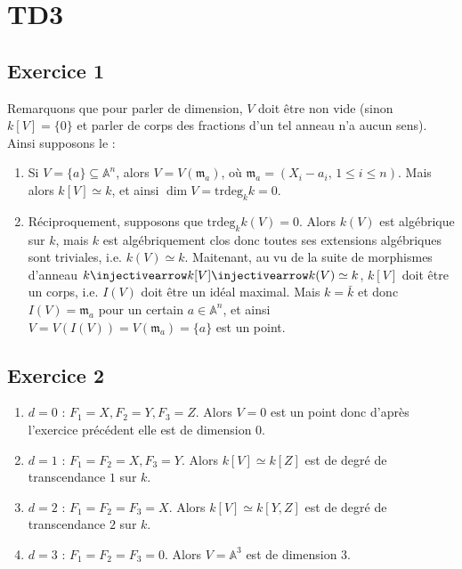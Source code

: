 \chapter{TD3}
    \section{Exercice 1}
        Remarquons que pour parler de dimension, $V$ doit être non vide (sinon $k[V] = \{0\}$ et parler de corps des fractions d'un tel anneau n'a aucun sens). Ainsi supposons le :
        \begin{enumerate}
            \item Si $V = \{a\} \subseteq \mathbb{A}^n$, alors $V = V(\mathfrak{m}_a)$, où $\mathfrak{m}_a = (X_i - a_i,\, 1 \leq i \leq n)$. Mais alors $k[V] \simeq k$, et ainsi $\dim V = \mathrm{trdeg}_kk = 0$.
            \item Réciproquement, supposons que $\mathrm{trdeg}_k k(V) = 0$. Alors $k(V)$ est algébrique sur $k$, mais $k$ est algébriquement clos donc toutes ses extensions algébriques sont triviales, i.e. $k(V) \simeq k$. Maitenant, au vu de la suite de morphismes d'anneau $k \injectivearrow k[V] \injectivearrow k(V) \simeq k$, $k[V]$ doit être un corps, i.e. $I(V)$ doit être un idéal maximal. Mais $k = \bar k$ et donc $I(V) = \mathfrak{m}_a$ pour un certain $a \in \mathbb{A}^n$, et ainsi $V = V(I(V)) = V(\mathfrak{m}_a) = \{a\}$ est un point.
        \end{enumerate}

    \section{Exercice 2}
        \begin{enumerate}
            \item $d = 0$ : $F_1 = X, F_2 = Y, F_3 = Z$. Alors $V = 0$ est un point donc d'après l'exercice précédent elle est de dimension $0$.
            \item $d = 1$ : $F_1 = F_2 = X, F_3 = Y$. Alors $k[V] \simeq k[Z]$ est de degré de transcendance $1$ sur $k$.
            \item $d = 2$ : $F_1 = F_2 = F_3 = X$. Alors $k[V] \simeq k[Y,Z]$ est de degré de transcendance $2$ sur $k$.
            \item $d = 3$ : $F_1 = F_2 = F_3 = 0$. Alors $V = \mathbb{A}^3$ est de dimension $3$.
        \end{enumerate}

